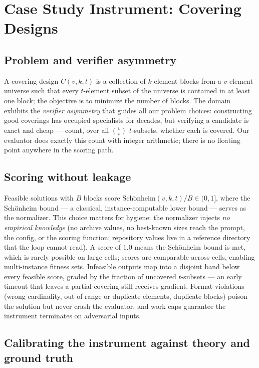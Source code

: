 \section{Case Study Instrument: Covering Designs}\label{sec:instrument}

\subsection{Problem and verifier asymmetry}

A covering design $C(v,k,t)$ is a collection of $k$-element blocks
from a $v$-element universe such that every $t$-element subset of the
universe is contained in at least one block; the objective is to
minimize the number of blocks. The domain exhibits the
\emph{verifier asymmetry} that guides all our problem choices:
constructing good coverings has occupied specialists for decades, but
verifying a candidate is exact and cheap --- count, over all
$\binom{v}{t}$ $t$-subsets, whether each is covered. Our evaluator
does exactly this count with integer arithmetic; there is no floating
point anywhere in the scoring path.

\subsection{Scoring without leakage}

Feasible solutions with $B$ blocks score
$\mathrm{Sch\ddot{o}nheim}(v,k,t)/B \in (0,1]$, where the
Sch\"onheim bound \cite{schonheim1964} --- a classical,
instance-computable lower bound --- serves as the normalizer. This
choice matters for hygiene: the normalizer injects \emph{no empirical
knowledge} (no archive values, no best-known sizes reach the prompt,
the config, or the scoring function; repository values live in a
reference directory that the loop cannot read). A score of $1.0$
means the Sch\"onheim bound is met, which is rarely possible on large
cells; scores are comparable across cells, enabling multi-instance
fitness sets. Infeasible outputs map into a disjoint band below
every feasible score, graded by the fraction of uncovered
$t$-subsets --- an early timeout that leaves a partial covering still
receives gradient. Format violations (wrong cardinality,
out-of-range or duplicate elements, duplicate blocks) poison the
solution but never crash the evaluator, and work caps guarantee the
instrument terminates on adversarial inputs.

\subsection{Calibrating the instrument against theory and ground truth}

